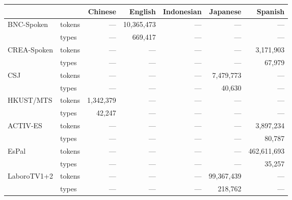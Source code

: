 \begin{tabular}{llrrrrr}
\toprule
 &  & Chinese & English & Indonesian & Japanese & Spanish \\
\midrule
\multirow[c]{2}{*}{BNC-Spoken} & tokens & --- & 10,365,473 & --- & --- & --- \\
 & \cellcolor[HTML]{EEEEEE} types & \cellcolor[HTML]{EEEEEE} --- & \cellcolor[HTML]{EEEEEE} 669,417 & \cellcolor[HTML]{EEEEEE} --- & \cellcolor[HTML]{EEEEEE} --- & \cellcolor[HTML]{EEEEEE} --- \\
\multirow[c]{2}{*}{CREA-Spoken} & tokens & --- & --- & --- & --- & 3,171,903 \\
 & \cellcolor[HTML]{EEEEEE} types & \cellcolor[HTML]{EEEEEE} --- & \cellcolor[HTML]{EEEEEE} --- & \cellcolor[HTML]{EEEEEE} --- & \cellcolor[HTML]{EEEEEE} --- & \cellcolor[HTML]{EEEEEE} 67,979 \\
\multirow[c]{2}{*}{CSJ} & tokens & --- & --- & --- & 7,479,773 & --- \\
 & \cellcolor[HTML]{EEEEEE} types & \cellcolor[HTML]{EEEEEE} --- & \cellcolor[HTML]{EEEEEE} --- & \cellcolor[HTML]{EEEEEE} --- & \cellcolor[HTML]{EEEEEE} 40,630 & \cellcolor[HTML]{EEEEEE} --- \\
\multirow[c]{2}{*}{HKUST/MTS} & tokens & 1,342,379 & --- & --- & --- & --- \\
 & \cellcolor[HTML]{EEEEEE} types & \cellcolor[HTML]{EEEEEE} 42,247 & \cellcolor[HTML]{EEEEEE} --- & \cellcolor[HTML]{EEEEEE} --- & \cellcolor[HTML]{EEEEEE} --- & \cellcolor[HTML]{EEEEEE} --- \\
\multirow[c]{2}{*}{ACTIV-ES} & tokens & --- & --- & --- & --- & 3,897,234 \\
 & \cellcolor[HTML]{EEEEEE} types & \cellcolor[HTML]{EEEEEE} --- & \cellcolor[HTML]{EEEEEE} --- & \cellcolor[HTML]{EEEEEE} --- & \cellcolor[HTML]{EEEEEE} --- & \cellcolor[HTML]{EEEEEE} 80,787 \\
\multirow[c]{2}{*}{EsPal} & tokens & --- & --- & --- & --- & 462,611,693 \\
 & \cellcolor[HTML]{EEEEEE} types & \cellcolor[HTML]{EEEEEE} --- & \cellcolor[HTML]{EEEEEE} --- & \cellcolor[HTML]{EEEEEE} --- & \cellcolor[HTML]{EEEEEE} --- & \cellcolor[HTML]{EEEEEE} 35,257 \\
\multirow[c]{2}{*}{LaboroTV1+2} & tokens & --- & --- & --- & 99,367,439 & --- \\
 & \cellcolor[HTML]{EEEEEE} types & \cellcolor[HTML]{EEEEEE} --- & \cellcolor[HTML]{EEEEEE} --- & \cellcolor[HTML]{EEEEEE} --- & \cellcolor[HTML]{EEEEEE} 218,762 & \cellcolor[HTML]{EEEEEE} --- \\

\end{tabular}
